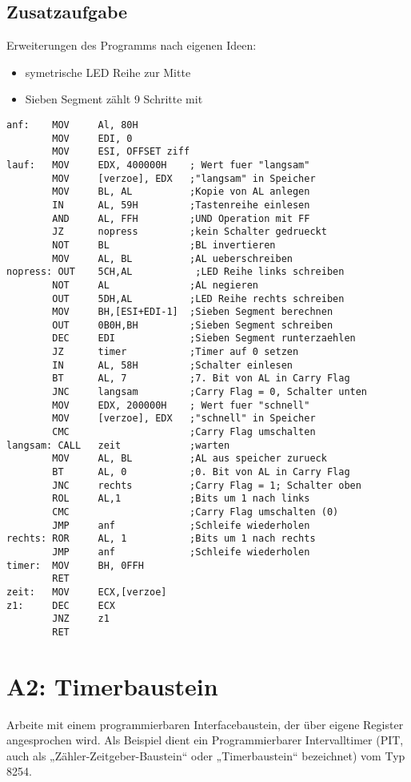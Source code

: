 \documentclass[a4paper,12pt,titlepage]{scrartcl}
\begin{document}
\subsection*{Zusatzaufgabe}
Erweiterungen des Programms nach eigenen Ideen:
\begin{itemize}
    \item symetrische LED Reihe zur Mitte
    \item Sieben Segment zählt 9 Schritte mit 
\end{itemize}
\begin{lstlisting}
anf:    MOV     Al, 80H
        MOV     EDI, 0 
        MOV     ESI, OFFSET ziff
lauf:   MOV     EDX, 400000H    ; Wert fuer "langsam"
        MOV     [verzoe], EDX   ;"langsam" in Speicher
        MOV     BL, AL          ;Kopie von AL anlegen
        IN      AL, 59H         ;Tastenreihe einlesen
        AND     AL, FFH         ;UND Operation mit FF
        JZ      nopress         ;kein Schalter gedrueckt
        NOT     BL              ;BL invertieren
        MOV     AL, BL          ;AL ueberschreiben
nopress: OUT    5CH,AL           ;LED Reihe links schreiben
        NOT     AL              ;AL negieren
        OUT     5DH,AL          ;LED Reihe rechts schreiben
        MOV     BH,[ESI+EDI-1]  ;Sieben Segment berechnen
        OUT     0B0H,BH         ;Sieben Segment schreiben
        DEC     EDI             ;Sieben Segment runterzaehlen
        JZ      timer           ;Timer auf 0 setzen
        IN      AL, 58H         ;Schalter einlesen
        BT      AL, 7           ;7. Bit von AL in Carry Flag
        JNC     langsam         ;Carry Flag = 0, Schalter unten
        MOV     EDX, 200000H    ; Wert fuer "schnell"
        MOV     [verzoe], EDX   ;"schnell" in Speicher
        CMC                     ;Carry Flag umschalten
langsam: CALL   zeit            ;warten
        MOV     AL, BL          ;AL aus speicher zurueck
        BT      AL, 0           ;0. Bit von AL in Carry Flag
        JNC     rechts          ;Carry Flag = 1; Schalter oben
        ROL     AL,1            ;Bits um 1 nach links
        CMC                     ;Carry Flag umschalten (0)
        JMP     anf             ;Schleife wiederholen
rechts: ROR     AL, 1           ;Bits um 1 nach rechts
        JMP     anf             ;Schleife wiederholen
timer:  MOV     BH, 0FFH
        RET 
zeit:   MOV     ECX,[verzoe]
z1:     DEC     ECX
        JNZ     z1
        RET
\end{lstlisting}

\section*{A2: Timerbaustein}
Arbeite mit einem programmierbaren Interfacebaustein, der über eigene Register angesprochen wird. Als Beispiel dient ein Programmierbarer Intervalltimer (PIT, auch als „Zähler-Zeitgeber-Baustein“ oder „Timerbaustein“ bezeichnet) vom Typ 8254.
\end{document}
